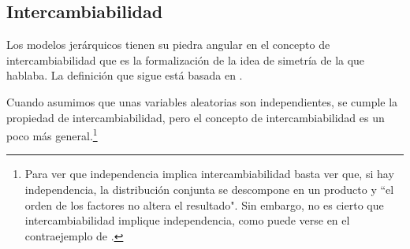 \subsection*{Intercambiabilidad}

Los modelos jerárquicos tienen su piedra angular en el concepto de intercambiabilidad que es la formalización de la idea de simetría de la que hablaba. La definición que sigue está basada en \textcite[Definiciones 2.2 y 2.3]{GP98}. 


Cuando asumimos que unas variables aleatorias son independientes, se cumple la propiedad de intercambiabilidad, pero el concepto de intercambiabilidad es un poco más general.\footnote{Para ver que independencia implica intercambiabilidad basta ver que, si hay independencia, la distribución conjunta se descompone en un producto y ``el orden de los factores no altera el resultado". Sin embargo, no es cierto que intercambiabilidad implique independencia, como puede verse en el contraejemplo de \textcite[8]{GP98}.}
